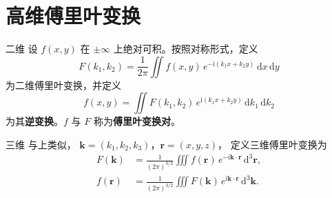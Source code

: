 \documentclass[fontset=windows, chinese, 10pt, xcolor=dvipsnames]{beamer}
\begin{document}

\section{高维傅里叶变换}

\begin{frame}{二维}
  设 $f(x,y)$ 在 $\pm\infty$ 上绝对可积。按照对称形式，定义
  \begin{equation*}
    F(k_1,k_2)
    =\frac{1}{2\pi}\iint
      f(x,y)\,e^{-\mathrm{i}(k_1 x+k_2 y)}
      \,\mathrm{d}x\,\mathrm{d}y
  \end{equation*}
  为二维傅里叶变换，并定义
  \begin{equation*}
    f(x,y)
    =\iint
      F(k_1,k_2)\,e^{\mathrm{i}(k_1 x+k_2 y)}
      \,\mathrm{d}k_1\,\mathrm{d}k_2
  \end{equation*}
  为其\textbf{逆变换}。$f$ 与 $F$ 称为\textbf{傅里叶变换对}。
\end{frame}

\begin{frame}{三维}
  与上类似，
  $\mathbf{k}=(k_1,k_2,k_3)$，$\mathbf{r}=(x,y,z)$，
  定义三维傅里叶变换为
  \begin{align*}
    F(\mathbf{k})
      &=\frac{1}{(2\pi)^{3/2}}\iiint
        f(\mathbf{r})\,e^{-\mathrm{i}\mathbf{k}\cdot\mathbf{r}}
        \,\mathrm{d}^3\mathbf{r},\\
    f(\mathbf{r})
      &=\frac{1}{(2\pi)^{3/2}} \iiint
        F(\mathbf{k})\,e^{\mathrm{i}\mathbf{k}\cdot\mathbf{r}}
        \,\mathrm{d}^3\mathbf{k}.
  \end{align*}
\end{frame}
\end{document}
